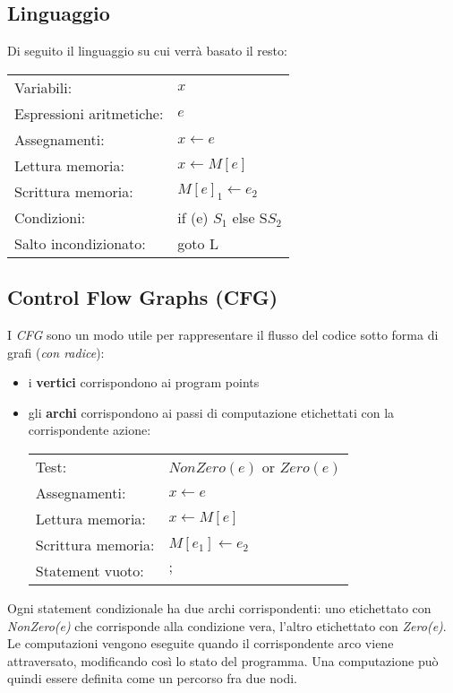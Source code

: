 \documentclass[a4paper, 10pt]{book}
\begin{document}
\subsection{Linguaggio}
Di seguito il linguaggio su cui verrà basato il resto:
	
\begin{center}
	\begin{tabular}{l l}
		Variabili: &  $x$ \\
		Espressioni aritmetiche: & $e$ \\
		Assegnamenti: & $x \gets e$ \\
		Lettura memoria: & $x \gets M[e]$ \\
		Scrittura memoria: & $M[e]_1 \gets e_2$ \\
		Condizioni: & if (e) $S_1$ else S$S_2$ \\
		Salto incondizionato: & goto L\\
	\end{tabular}
\end{center}

\subsection{Control Flow Graphs (CFG)}
I \emph{CFG} sono un modo utile per rappresentare il flusso del codice sotto forma di grafi (\emph{con 
radice}):
\begin{itemize}
    \item i \textbf{vertici} corrispondono ai program points
    \item gli \textbf{archi} corrispondono ai passi di computazione etichettati con la corrispondente
        azione:
        \begin{center}
        	\begin{tabular}{l l}
        		Test: & $NonZero(e)$ or $Zero(e)$ \\
        		Assegnamenti: & $x \gets e$ \\
        		Lettura memoria: & $x \gets M[e]$ \\
        		Scrittura memoria: & $M[e_1] \gets e_2$ \\
        		Statement vuoto: & $;$ \\
        	\end{tabular}
        \end{center}
\end{itemize}
Ogni statement condizionale ha due archi corrispondenti: uno etichettato con \emph{NonZero(e)} che corrisponde
alla condizione vera, l'altro etichettato con \emph{Zero(e)}.
\newline
Le computazioni vengono eseguite quando il corrispondente arco viene attraversato, modificando così lo stato
del programma. Una computazione può quindi essere definita come un percorso fra due nodi.
\end{document}
